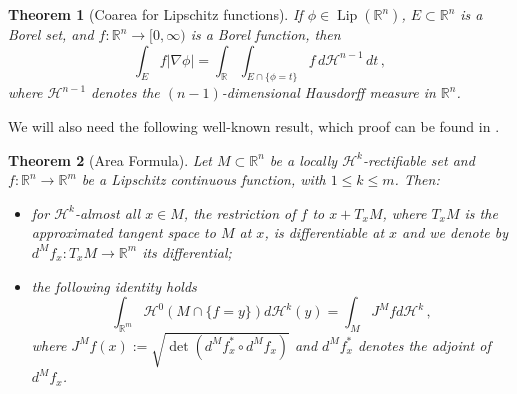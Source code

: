 \documentclass[a4paper,reqno,11pt]{amsart}
\newtheorem{theorem}{Theorem}[section]
\newcommand{\R}{\mathbb{R}}
\newcommand{\Hau}{{\mathcal H}} %
\newcommand{\Lip}{\mathop{\mathrm{Lip}}}
\begin{document}
\begin{theorem}[Coarea for Lipschitz functions] \label{thm:coareaLip}
If $\phi\in \Lip(\R^{n})$, $E\subset \R^{n}$ is a Borel set, and $f:\R^{n}\to [0,\infty)$ is a Borel function, then
\[
\int_{E}f |\nabla \phi| = \int_{\R} \int_{E\cap \{\phi = t\}}f\, d\Hau^{n-1}\, dt\,,
\]
where $\Hau^{n-1}$ denotes the $(n-1)$-dimensional Hausdorff measure in $\R^{n}$.
\end{theorem}

We will also need the following well-known result, which proof can be found in \cite{maggi2012sets}.
\begin{theorem}[Area Formula] \label{thm:AreaForm}
	Let $M \subset \R^n$ be a locally $\Hau^k$-rectifiable set and $f: \R^n \to \R^m$ be a Lipschitz continuous function, with $1 \leq k \leq m$. Then:
	\begin{itemize}
		\item[(i)] for $\Hau^k$-almost all $x \in M$, the restriction of $f$ to $x + T_x M$, where $T_xM$ is the approximated tangent space to $M$ at $x$, is differentiable at $x$ and we denote by $d^M f_x : T_x M \to \R^m$ its differential;
		\item[(ii)] the following identity holds
		\begin{equation} \label{eq:AreaForm}
			\int_{\R^m} \Hau^0(M \cap \{ f = y \}) d \Hau^k(y) = \int_M J^M f d \Hau^k \, ,
		\end{equation}
	    where $J^M f (x) := \sqrt{\det(d^M f^\ast_x \circ d^M f_x)}$ and $d^M f^\ast_x$ denotes the adjoint of $d^M f_x$.
	\end{itemize}
\end{theorem}
\end{document}
